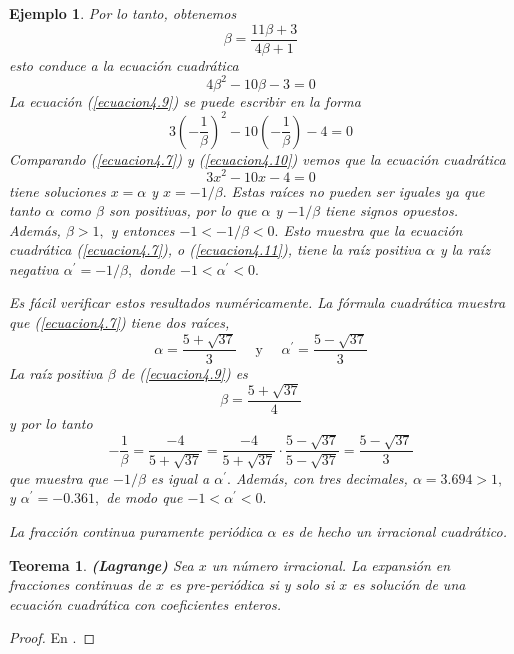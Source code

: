 \documentclass[12pt]{report}
\newtheorem{teo}{Teorema}[section]
\newtheorem{ejem}{Ejemplo}[section]
\begin{document}
\begin{ejem}
    Por lo tanto, obtenemos
    \begin{equation}
        \beta=\frac{11 \beta+3}{4 \beta+1}
        \label{ecuacion4.8}
    \end{equation}
    esto conduce a la ecuación cuadrática
    \begin{equation}
            4 \beta^{2}-10 \beta-3=0
            \label{ecuacion4.9}
    \end{equation}
    La ecuación (\ref{ecuacion4.9}) se puede escribir en la forma
    \begin{equation}
        3\left(-\frac{1}{\beta}\right)^{2}-10\left(-\frac{1}{\beta}\right)-4=0
        \label{ecuacion4.10}
    \end{equation}
    Comparando (\ref{ecuacion4.7}) y (\ref{ecuacion4.10}) vemos que la ecuación cuadrática
    \begin{equation}
    3 x^{2}-10 x-4=0
    \label{ecuacion4.11}
    \end{equation}
    tiene soluciones $ x = \alpha $ y $ x = -1 / \beta. $ Estas raíces no pueden ser iguales ya que tanto $ \alpha $ como $ \beta $ son positivas, por lo que $ \alpha $ y $ -1 / \beta $ tiene signos opuestos. Además, $ \beta> 1, $ y entonces $ -1 <-1 / \beta <0. $ Esto muestra que la ecuación cuadrática (\ref{ecuacion4.7}),  o  (\ref{ecuacion4.11}), tiene la raíz positiva $ \alpha $ y la raíz negativa $ \alpha ^ {\prime} = - 1 / \beta, $ donde $ -1 <\alpha ^ {\prime} <0. $
    
    Es fácil verificar estos resultados numéricamente. La fórmula cuadrática muestra que (\ref{ecuacion4.7}) tiene dos raíces,
    $$
    \alpha=\frac{5+\sqrt{37}}{3} \quad \text { y } \quad \alpha^{\prime}=\frac{5-\sqrt{37}}{3}
    $$
    La raíz positiva $\beta$ de (\ref{ecuacion4.9}) es
    $$
    \beta=\frac{5+\sqrt{37}}{4}
    $$
    y por lo tanto
    $$
    -\frac{1}{\beta}=\frac{-4}{5+\sqrt{37}}=\frac{-4}{5+\sqrt{37}} \cdot \frac{5-\sqrt{37}}{5-\sqrt{37}}=\frac{5-\sqrt{37}}{3}
    $$
    que muestra que $ -1 / \beta $ es igual a $ \alpha ^ {\prime}. $ Además, con tres decimales, $ \alpha = 3.694> 1, $ y $ \alpha^{\prime}= -0.361 , $ de modo que $ -1 <\alpha^{\prime} <0. $

    La fracción continua puramente periódica $ \alpha $ es de hecho un irracional cuadrático.
\end{ejem}
\begin{teo}
\textbf{(Lagrange)} Sea $x$ un número irracional. La expansión en fracciones continuas de $x$ es pre-periódica si y solo si $x$ es solución de una ecuación cuadrática con coeficientes enteros.
\label{Lagrange}
\end{teo}
\begin{proof}
En \cite{Portugues}.
\end{proof}
\end{document}
